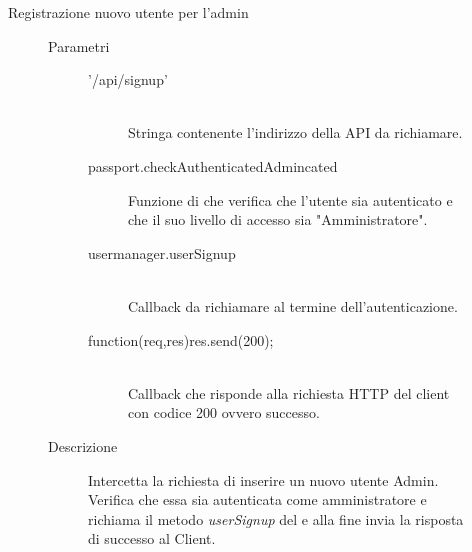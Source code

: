 \begin{description}
\begin{description}
\begin{mldescription}
 \end{mldescription} 
 \item[Registrazione nuovo utente per l'admin]
 \begin{mldescription}
  \begin{description}
     \item[Parametri] \hfill
      \begin{description}
       \item['/api/signup'] \hfill \\
       Stringa contenente l'indirizzo della API da richiamare.
       \item[passport.checkAuthenticatedAdmincated]
       Funzione di  che verifica che l'utente sia autenticato e che il suo livello di accesso sia "Amministratore".
       \item[usermanager.userSignup] \hfill \\
       Callback da richiamare al termine dell'autenticazione.
       \item[function(req,res){res.send(200);}] \hfill \\
       Callback che risponde alla richiesta HTTP del client con codice 200 ovvero successo.
      \end{description}
     \item[Descrizione]
     Intercetta la richiesta di inserire un nuovo utente Admin. Verifica che essa sia autenticata come amministratore e richiama il metodo \textit{userSignup} del  e alla fine invia la risposta di successo al Client.
  \end{description}
 \end{mldescription}
  

\end{description}
\end{description}
